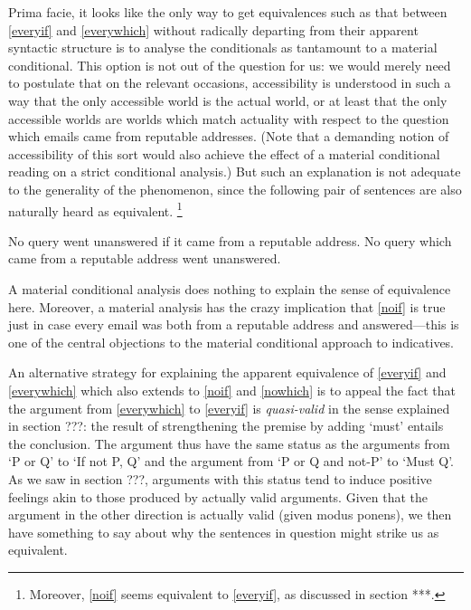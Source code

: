 \documentclass[If.tex]{subfiles}
\begin{document}
Prima facie, it looks like the only way to get equivalences such as that between \ref{everyif} and \ref{everywhich} without radically departing from their apparent syntactic structure is to analyse the conditionals as tantamount to a material conditional.  This option is not out of the question for us: we would merely need to postulate that on the relevant occasions, accessibility is understood in such a way that the only accessible world is the actual world, or at least that the only accessible worlds are worlds which match actuality with respect to the question which emails came from reputable addresses.  (Note that a demanding notion of accessibility of this sort would also achieve the effect of a material conditional reading on a strict conditional analysis.)  But such an explanation is not adequate to the generality of the phenomenon, since the following pair of sentences are also naturally heard as equivalent.%
\footnote{Moreover, \ref{noif} seems equivalent to \ref{everyif}, as discussed in section ***.}
\begin{prop}
	\nitem \label{noif}
	No query went unanswered if it came from a reputable address.
	\nitem \label{nowhich}
	No query which came from a reputable address went unanswered.
\end{prop}
A material conditional analysis does nothing to explain the sense of equivalence here.  Moreover, a material analysis has the crazy implication that \ref{noif} is true just in case every email was both from a reputable address and answered---this is one of the central objections to the material conditional approach to indicatives.  

An alternative strategy for explaining the apparent equivalence of \ref{everyif} and \ref{everywhich} which also extends to \ref{noif} and \ref{nowhich} is to appeal the fact that the argument from \ref{everywhich} to \ref{everyif} is \emph{quasi-valid} in the sense explained in section ???: the result of strengthening the premise by adding ‘must’ entails the conclusion. The argument thus have the same status as the arguments from ‘P or Q’ to ‘If not P, Q’ and the argument from ‘P or Q and not-P’ to ‘Must Q’. As we saw in section ???, arguments with this status tend to induce positive feelings akin to those produced by actually valid arguments.  Given that the argument in the other direction is actually valid (given modus ponens), we then have something to say about why the sentences in question might strike us as equivalent.  
\end{document}
